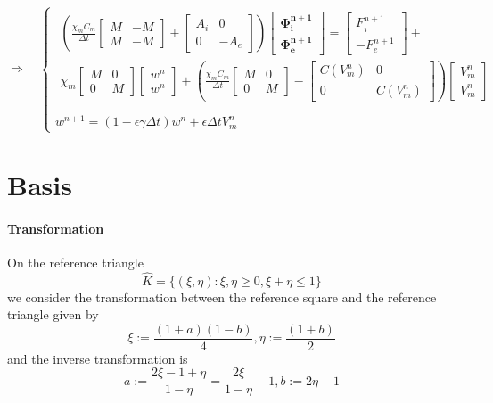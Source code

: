 \documentclass[a4paper]{article}
\theoremstyle{definition}
\begin{document}
\begin{equation}
\Rightarrow \quad 
\begin{cases}
\begin{gathered}
\left(
	\frac{\chi_m C_m}{\Delta t} \begin{bmatrix}M & -M \\ M & -M\end{bmatrix}
	+ \begin{bmatrix} A_i & 0 \\ 0 & -A_e \end{bmatrix}
	\right) \begin{bmatrix} \bm{\Phi_i^{n+1}} \\ \bm{\Phi_e^{n+1}}  \end{bmatrix} =
	\begin{bmatrix} F_i^{n+1} \\ -F_e^{n+1} \end{bmatrix} + \\
	\chi_m\begin{bmatrix} M & 0 \\ 0 & M \end{bmatrix} \begin{bmatrix} w^n \\ w^n \end{bmatrix} +
	\left(\frac{\chi_mC_m}{\Delta t}\begin{bmatrix} M & 0 \\ 0 & M \end{bmatrix}
	- \begin{bmatrix} C(V_m^n) & 0 \\ 0 & C(V_m^n)\end{bmatrix} 
	\right) \begin{bmatrix} V_m^n \\ V_m^n \end {bmatrix}
	 \end{gathered} \\ \\
	w^{n+1} = (1-\epsilon \gamma \Delta t) w^n + \epsilon \Delta tV_m^n
\end{cases}
\end{equation}
\newpage
\section{Basis}
\paragraph{Transformation}
	On the reference triangle
	\begin{equation}
	\hat{K}=\{ (\xi, \eta) : \xi, \eta \ge 0,	\xi+\eta \le 1 \}
	\end{equation}
	we consider the transformation between the reference square and the reference triangle given by
	\begin{equation}
	\xi:=\frac{(1+a)(1-b)}{4},  \eta:=\frac{(1+b)}{2}
	\end{equation}
	and the inverse transformation is
	\begin{equation}
	a:=\frac{2\xi-1+\eta}{1-\eta}=\frac{2\xi}{1-\eta}-1,	b:=2\eta-1
	\end{equation}
\end{document}

